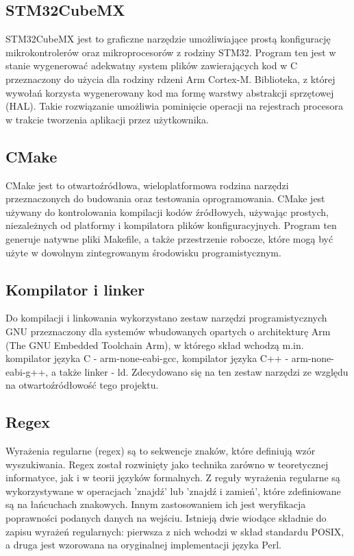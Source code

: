 \subsection{STM32CubeMX} \label{sec:cube}
STM32CubeMX jest to graficzne narzędzie umożliwiające prostą konfigurację mikrokontrolerów oraz
mikroprocesorów z rodziny STM32. Program ten jest w stanie wygenerować adekwatny system plików
zawierających kod w C przeznaczony do użycia dla rodziny rdzeni Arm Cortex-M. Biblioteka, z której
wywołań korzysta wygenerowany kod ma formę warstwy abstrakcji sprzętowej (HAL). Takie rozwiązanie
umożliwia pominięcie operacji na rejestrach procesora w trakcie tworzenia aplikacji przez użytkownika.

\subsection{CMake} \label{sec:cmake}
CMake jest to otwartoźródłowa, wieloplatformowa rodzina narzędzi przeznaczonych do budowania oraz
testowania oprogramowania. CMake jest używany do kontrolowania kompilacji kodów źródłowych, używając
prostych, niezależnych od platformy i kompilatora plików konfiguracyjnych. Program ten generuje
natywne pliki Makefile, a także przestrzenie robocze, które mogą być użyte w dowolnym zintegrowanym
środowisku programistycznym. 

\subsection{Kompilator i linker} \label{sec:gcc}
Do kompilacji i linkowania wykorzystano zestaw narzędzi programistycznych GNU przeznaczony dla
systemów wbudowanych opartych o architekturę Arm (The GNU Embedded Toolchain Arm), w którego
skład wchodzą m.in. kompilator języka C - arm-none-eabi-gcc, kompilator języka C++
- arm-none-eabi-g++, a także linker - ld. Zdecydowano się na ten zestaw narzędzi ze względu na 
otwartoźródłowość tego projektu.

\subsection{Regex} \label{sec:regex}
Wyrażenia regularne (regex) są to sekwencje znaków, które definiują wzór wyszukiwania. Regex został
rozwinięty jako technika zarówno w teoretycznej informatyce, jak i w teorii języków formalnych.
Z reguły wyrażenia regularne są wykorzystywane w operacjach 'znajdź' lub 'znajdź i zamień', które
zdefiniowane są na łańcuchach znakowych. Innym zastosowaniem ich jest weryfikacja poprawności podanych
danych na wejściu. Istnieją dwie wiodące składnie do zapisu wyrażeń regularnych: pierwsza z nich
wchodzi w skład standardu POSIX, a druga jest wzorowana na oryginalnej implementacji języka Perl. 

